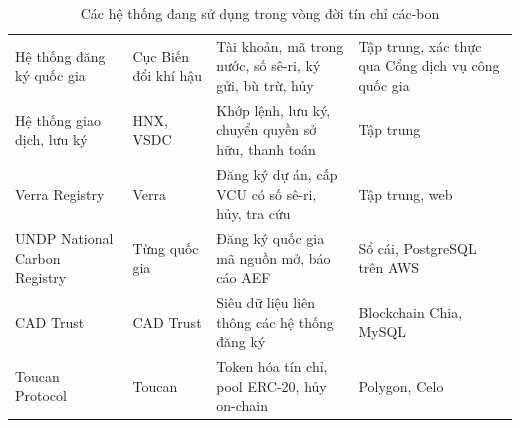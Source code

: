 \begin{table}[!htbp]
    \centering
    \caption{Các hệ thống đang sử dụng trong vòng đời tín chỉ các-bon}
    \label{tab:ks-hethong}
    \small
    \begin{tabularx}{\textwidth}{|L{3.2cm}|L{2.6cm}|Y|L{2.6cm}|}
        \hline
         &  &  &  \\
        \hline
        Hệ thống đăng ký quốc gia~\cite{vietnam2026thongtu11} & Cục Biến đổi khí hậu & Tài khoản, mã trong nước, số sê-ri, ký gửi, bù trừ, hủy & Tập trung, xác thực qua Cổng dịch vụ công quốc gia \\
        \hline
        Hệ thống giao dịch, lưu ký~\cite{vietnam2026nghidinh29} & HNX, VSDC & Khớp lệnh, lưu ký, chuyển quyền sở hữu, thanh toán & Tập trung \\
        \hline
        Verra Registry~\cite{verra2024vcs} & Verra & Đăng ký dự án, cấp VCU có số sê-ri, hủy, tra cứu & Tập trung, web \\
        \hline
        UNDP National Carbon Registry~\cite{undp2024nationalregistry} & Từng quốc gia & Đăng ký quốc gia mã nguồn mở, báo cáo AEF & Sổ cái, PostgreSQL trên AWS \\
        \hline
        CAD Trust~\cite{cadtrust2025datamodel} & CAD Trust & Siêu dữ liệu liên thông các hệ thống đăng ký & Blockchain Chia, MySQL \\
        \hline
        Toucan Protocol~\cite{toucan2025docs} & Toucan & Token hóa tín chỉ, pool ERC-20, hủy on-chain & Polygon, Celo \\
        \hline
    \end{tabularx}
\end{table}

